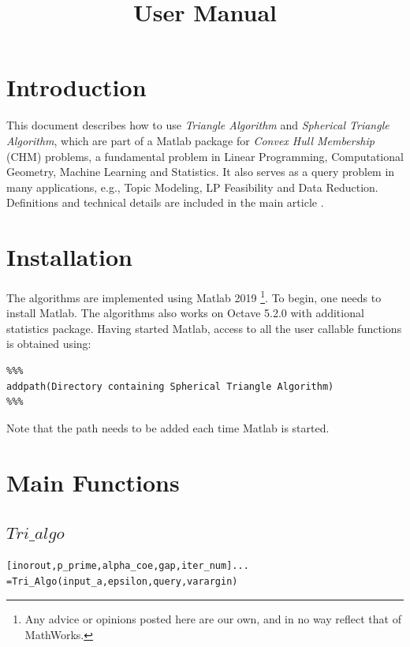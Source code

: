 \documentclass[a4paper,12pt]{article}
\title{User Manual}
\author{}
\date{}
\begin{document}
	\maketitle
	\tableofcontents
	


\section{Introduction}
This document describes how to use \emph{Triangle Algorithm} and \emph{Spherical Triangle Algorithm}, which are part of a Matlab package for \textit{Convex Hull Membership } (CHM) problems, a fundamental problem in Linear Programming, Computational Geometry, Machine Learning and Statistics. It also serves as a query problem in many applications, e.g., Topic Modeling, LP Feasibility and Data Reduction. Definitions and technical details are included in the main article \cite{kalantari20191}.


\section{Installation}
The algorithms are implemented using Matlab 2019 \footnote{Any advice or opinions posted here are our own, and in no way reflect that of MathWorks.}. To begin, one needs to install Matlab. The algorithms also works on Octave 5.2.0 with additional statistics package.  Having started Matlab, access to all the user callable functions is obtained using:
\begin{verbatim}
%%%
addpath(Directory containing Spherical Triangle Algorithm)
%%%
\end{verbatim}
Note that the path needs to be added each time Matlab is started.
\section{Main Functions}


\subsection{$Tri\_algo$}
\begin{verbatim}
[inorout,p_prime,alpha_coe,gap,iter_num]...
=Tri_Algo(input_a,epsilon,query,varargin)
\end{verbatim}
\end{document}
